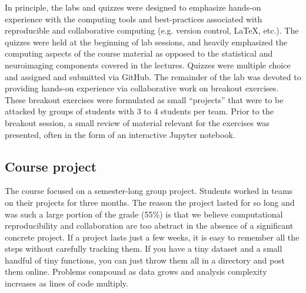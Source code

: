 In principle, the labs and quizzes were designed to emphasize hands-on 
experience with the computing tools and best-practices associated with
reproducible and collaborative computing (e.g. version control, \LaTeX, etc.).
The quizzes were held at the beginning of lab sessions, and heavily emphasized
the computing aspects of the course material as opposed to the statistical and
neuroimaging components covered in the lectures.
Quizzes were multiple choice and assigned and submitted via GitHub.
The remainder of the lab was devoted to providing hands-on experience via
collaborative work on breakout exercises.
These breakout exercises were formulated as small ``projects'' that were to be
attacked by groups of students with 3 to 4 students per team.
Prior to the breakout session, a small review of material relevant for the 
exercises was presented, often in the form of an interactive Jupyter notebook.

\subsection{Course project}\label{project}

The course focused on a semester-long group project.
Students worked in teams on their projects for three months.
The reason the project lasted for so long and was such a large portion of the grade (55\%)
is that we believe computational reproducibility and collaboration
are too abstract in the absence of a significant concrete project.
If a project lasts just a few weeks, it is easy to remember all the steps
without carefully tracking them.
If you have a tiny dataset and a small handful of tiny functions, you can just
throw them all in a directory and post them online.
Problems compound as data grows and analysis complexity increases as lines of
code multiply.


